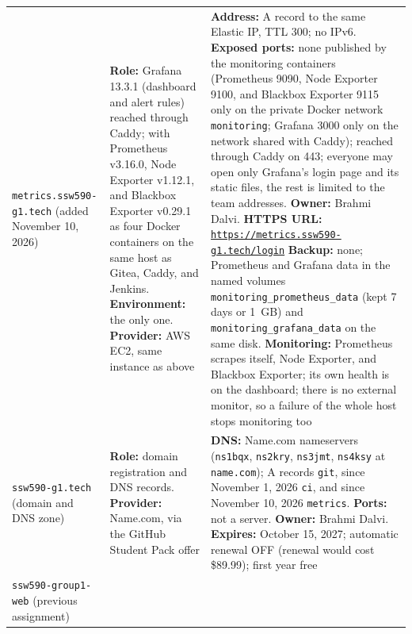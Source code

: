 \begin{tabularx}{\linewidth}{L{3.8cm}YY}
\small \texttt{metrics.ssw590-g1.tech} (added November 10, 2026) &
\small \textbf{Role:} Grafana 13.3.1 (dashboard and alert rules) reached through Caddy; with Prometheus v3.16.0, Node Exporter v1.12.1, and Blackbox Exporter v0.29.1 as four Docker containers on the same host as Gitea, Caddy, and Jenkins.\newline
\textbf{Environment:} the only one.\newline
\textbf{Provider:} AWS EC2, same instance as above &
\small \textbf{Address:} A record to the same Elastic IP, TTL 300; no IPv6.\newline
\textbf{Exposed ports:} none published by the monitoring containers (Prometheus 9090, Node Exporter 9100, and Blackbox Exporter 9115 only on the private Docker network \texttt{monitoring}; Grafana 3000 only on the network shared with Caddy); reached through Caddy on 443; everyone may open only Grafana's login page and its static files, the rest is limited to the team addresses.\newline
\textbf{Owner:} Brahmi Dalvi.\newline
\textbf{HTTPS URL:} \href{https://metrics.ssw590-g1.tech/login}{\texttt{https://metrics.ssw590-g1.tech/login}}\newline
\textbf{Backup:} none; Prometheus and Grafana data in the named volumes \texttt{monitoring\_prometheus\_data} (kept 7 days or 1~GB) and \texttt{monitoring\_grafana\_data} on the same disk.\newline
\textbf{Monitoring:} Prometheus scrapes itself, Node Exporter, and Blackbox Exporter; its own health is on the dashboard; there is no external monitor, so a failure of the whole host stops monitoring too\\
\small \texttt{ssw590-g1.tech} (domain and DNS zone) &
\small \textbf{Role:} domain registration and DNS records.\newline
\textbf{Provider:} Name.com, via the GitHub Student Pack offer &
\small \textbf{DNS:} Name.com nameservers (\texttt{ns1bqx}, \texttt{ns2kry}, \texttt{ns3jmt}, \texttt{ns4ksy} at \texttt{name.com}); A records \texttt{git}, since November 1, 2026 \texttt{ci}, and since November 10, 2026 \texttt{metrics}.\newline
\textbf{Ports:} not a server.\newline
\textbf{Owner:} Brahmi Dalvi.\newline
\textbf{Expires:} October 15, 2027; automatic renewal OFF (renewal would cost \$89.99); first year free\\
\small \texttt{ssw590-group1-web} (previous assignment) &

\end{tabularx}
